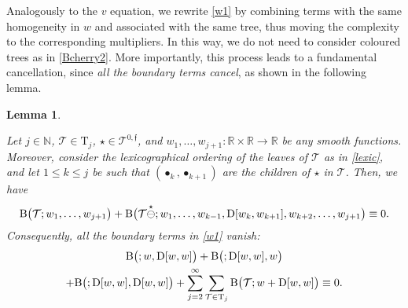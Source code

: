 \documentclass[a4paper,
11pt,  reqno]{amsart}
\makeatletter
\newcommand{\5}{\textup{V}}
\newcommand{\noi}{\noindent}
\newtheorem{lemma}[theorem]{Lemma}
\theoremstyle{remark}
\newcommand{\R}{\mathbb{R}}
\newcommand{\bul}{\bullet}
\newcommand{\TT}{\mathcal{T}}
\newcommand{\Tr}{\mathrm{T}}
\newcommand{\ff}{\mathfrak{f}}
\newcommand{\N}{\mathbb{N}}
\def\<#1>{\csname MH@symb@#1\endcsname}
\numberwithin{equation}{section}
\numberwithin{theorem}{section}
\newcommand{\BB}{\mathrm{B}}
\newcommand{\D}{\mathrm{D}}
\makeatother
\begin{document}
\noi Analogously to the $v$ equation, we rewrite \eqref{w1} by combining terms with the same homogeneity in $w$ and associated with the same tree, thus moving the complexity to the corresponding multipliers. In this way, we do not need to consider coloured trees as in \eqref{Bcherry2}. More importantly, this process leads to a fundamental cancellation, since \textit{all the boundary terms cancel}, as shown in the following lemma.





\begin{lemma}
\label{LEM:wbd}




Let $j\in\N$, $\TT\in \Tr_j$,
$\star \in \TT^{0,\ff}$, and $w_1, \ldots, w_{j+1}: \R\times \R \to \R$ be any smooth functions. Moreover, consider the lexicographical ordering of the leaves of $\TT$ as in \eqref{lexic},
and let $1 \le k \le j$ be such that $(\bul_k, \bul_{k+1})$ are the children of $\star$ in $\TT$.
Then, we have
\begin{align}
\label{wbd0}
\BB\big(\TT ; w_1, \ldots, w_{j+1} \big)
+ \BB\big(\TT\overset{\star}{\ominus} \<1>; w_1,  \ldots, w_{k-1} , \D[w_k,w_{k+1}] , w_{k+2}, \ldots,  w_{j+1} \big)
\equiv 0.
\end{align}
Consequently, all the boundary terms in \eqref{w1} vanish:
\begin{multline}
\label{wbd1}
  \BB \big(\<1>; w, \D[w, w] \big)
+ \BB\big(\<1>; \D[w, w],w\big)
\\
+
\BB\big(\<1>;\D[w, w], \D[w, w]\big)
+ \sum_{j=2}^\infty \sum_{\TT\in \Tr_j}  \BB\big(\TT; w + \D[w, w]\big)  \equiv 0  .
\end{multline}


\end{lemma}
\end{document}
